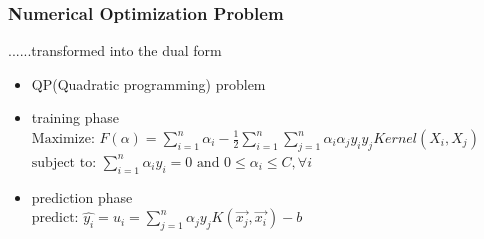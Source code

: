 \documentclass{beamer}
\begin{document}
\begin{frame}
	\frametitle{Numerical Optimization Problem}
	......transformed into the dual form
	
	\begin{itemize}
		\item QP(Quadratic programming) problem
		\item training phase \\
		$\text{Maximize: } F(\alpha)=\sum_{i=1}^{n}\alpha_i- \frac 1 2 \sum_{i=1}^{n}\sum_{j=1}^{n}\alpha_i\alpha_jy_iy_jKernel(X_i,X_j)$ \\ $\text{subject to: } \sum_{i=1}^{n}\alpha_iy_i=0 \text{ and } 0 \leq \alpha_i \leq C, \forall i$	
		\item prediction phase \\
			$ \text{predict: } \hat{y_i} = u_i = \sum_{j=1}^{n}\alpha_jy_jK(\vec{x_j},\vec{x_i})-b $
	
	\end{itemize}	
	
\end{frame}
\end{document}
